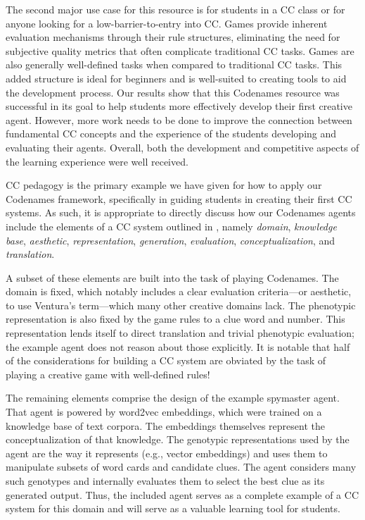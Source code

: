 \documentclass[phd,electronic,oneside,twosidetoc,letterpaper,chaptercenter,parttop,lof]{byumsphd}
\begin{document}
The second major use case for this resource is for students in a CC class or for anyone looking for a low-barrier-to-entry into CC. Games provide inherent evaluation mechanisms through their rule structures, eliminating the need for subjective quality metrics that often complicate traditional CC tasks. Games are also generally well-defined tasks when compared to traditional CC tasks. This added structure is ideal for beginners and is well-suited to creating tools to aid the development process. Our results show that this Codenames resource was successful in its goal to help students more effectively develop their first creative agent. However, more work needs to be done to improve the connection between fundamental CC concepts and the experience of the students developing and evaluating their agents. Overall, both the development and competitive aspects of the learning experience were well received.

CC pedagogy is the primary example we have given for how to apply our Codenames framework, specifically in guiding students in creating their first CC systems. As such, it is appropriate to directly discuss how our Codenames agents include the elements of a CC system outlined in \cite{ventura2017howto}, namely \emph{domain}, \emph{knowledge base}, \emph{aesthetic}, \emph{representation}, \emph{generation}, \emph{evaluation}, \emph{conceptualization}, and \emph{translation}.

A subset of these elements are built into the task of playing Codenames. The domain is fixed, which notably includes a clear evaluation criteria---or aesthetic, to use Ventura’s term---which many other creative domains lack. The phenotypic representation is also fixed by the game rules to a clue word and number. This representation lends itself to direct translation and trivial phenotypic evaluation; the example agent does not reason about those explicitly. It is notable that half of the considerations for building a CC system are obviated by the task of playing a creative game with well-defined rules!

The remaining elements comprise the design of the example spymaster agent. That agent is powered by word2vec embeddings, which were trained on a knowledge base of text corpora. The embeddings themselves represent the conceptualization of that knowledge. The genotypic representations used by the agent are the way it represents (e.g., vector embeddings) and uses them to manipulate subsets of word cards and candidate clues. The agent considers many such genotypes and internally evaluates them to select the best clue as its generated output. Thus, the included agent serves as a complete example of a CC system for this domain and will serve as a valuable learning tool for students.
\end{document}

